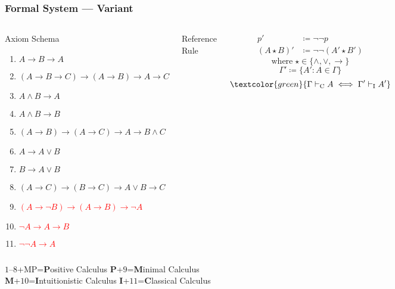 \documentclass[UTF8,11pt,colorlinks,compress,openany]{beamer}%
\begin{document}
\begin{frame}\frametitle{Formal System --- Variant}\vspace*{-5pt}
	\begin{columns}
			\begin{block}{Axiom Schema}
				\begin{enumerate}
					\item $A\to B\to A$
					\item $(A\to B\to C)\to(A\to B)\to A\to C$
					\item $A\wedge B\to A$
					\item $A\wedge B\to B$
					\item $(A\to B)\to(A\to C)\to A\to B\wedge C$
					\item $A\to A\vee B$
					\item $B\to A\vee B$
					\item $(A\to C)\to(B\to C)\to A\vee B\to C$
					\item \textcolor{red}{$(A\to\neg B)\to(A\to B)\to\neg A$}
					\item \textcolor{red}{$\neg A\to A\to B$}
					\item \textcolor{red}{$\neg\neg A\to A$}
				\end{enumerate}
			\end{block}
			\begin{block}{Reference Rule}
				\begin{prooftree}
					\alwaysSingleLine
					\RightLabel{\textcolor{yellow}{[MP]}}
				\end{prooftree}
			\end{block}
			\vbox{
				\begin{align*}
				p'&\coloneqq \neg\neg p\\
				(A\star B)'&\coloneqq \neg\neg(A'\star B')
				\end{align*}\vspace{-21pt}
				\[\text{where}\;\star\in\{\wedge,\vee,\to\}\]
				\[\Gamma'\coloneqq \{A': A\in\Gamma\}\]
				\[\textcolor{green}{\Gamma\vdash_{\mathrm{C}} A\iff\Gamma'\vdash_{\mathrm{I}} A'}\]
			}
	\end{columns}
	\vspace{5pt}\centering
	$1$--$8$+MP=\textbf{P}ositive Calculus \quad \textbf{P}+$9$=\textbf{M}inimal Calculus\\
	\textbf{M}+$10$=\textbf{I}ntuitionistic Calculus \quad \textbf{I}+$11$=\textbf{C}lassical Calculus
\end{frame}
\end{document}
